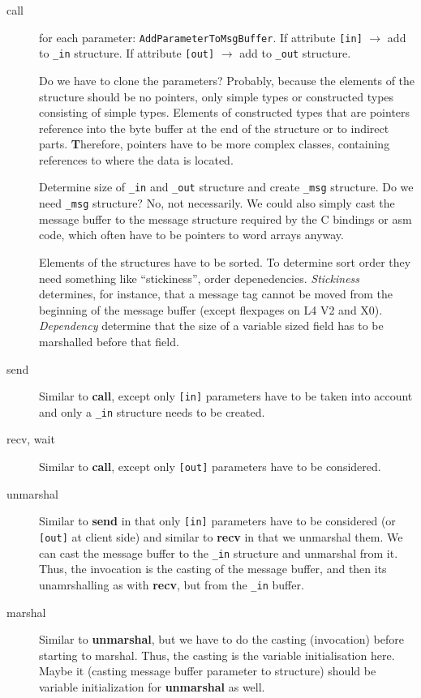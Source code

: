 \begin{description}
\item[call] for each parameter: \verb|AddParameterToMsgBuffer|. If 
  attribute \verb|[in]| $\rightarrow$ add to \verb|_in| structure.
  If attribute \verb|[out]| $\rightarrow$ add to \verb|_out| structure.

  Do we have to clone the parameters? Probably, because the elements
  of the structure should be no pointers, only simple types or constructed
  types consisting of simple types.  Elements of constructed types that 
  are pointers reference into the byte buffer at the end of the structure
  or to indirect parts.  {\textbf Therefore, pointers have to be more
  complex classes, containing references to where the data is located.}

  Determine size of \verb|_in| and \verb|_out| structure and create 
  \verb|_msg| structure. Do we need \verb|_msg| structure? No, not 
  necessarily.  We could also simply cast the message buffer to the
  message structure required by the C bindings or asm code, which often
  have to be pointers to word arrays anyway.

  Elements of the structures have to be sorted.  To determine sort 
  order they need something like ``stickiness'', order depenedencies.
  \emph{Stickiness} determines, for instance, that a message tag cannot
  be moved from the beginning of the message buffer (except flexpages
  on L4 V2 and X0). \emph{Dependency} determine that the size of a 
  variable sized field has to be marshalled before that field.

\item[send] Similar to \textbf{call}, except only \verb|[in]| parameters
  have to be taken into account and only a \verb|_in| structure needs
  to be created.

\item[recv, wait] Similar to \textbf{call}, except only \verb|[out]|
  parameters have to be considered.

\item[unmarshal] Similar to \textbf{send} in that only \verb|[in]| 
  parameters have to be considered (or \verb|[out]| at client side)
  and similar to \textbf{recv} in that we unmarshal them.  We can
  cast the message buffer to the \verb|_in| structure and unmarshal
  from it.  Thus, the invocation is the casting of the message buffer,
  and then its unamrshalling as with \textbf{recv}, but from the
  \verb|_in| buffer.

\item[marshal] Similar to \textbf{unmarshal}, but we have to do
  the casting (invocation) before starting to marshal.  Thus, the
  casting is the variable initialisation here.  Maybe it (casting
  message buffer parameter to structure) should be variable initialization
  for \textbf{unmarshal} as well.
  

\end{description}
